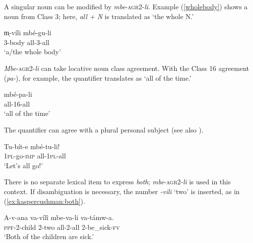 \documentclass[output=paper,modfonts,nonflat]{langsci/langscibook}
\begin{document}
A singular noun can be modified by \textit{mbe}-\textsc{agr2}-\textit{li}. Example (\ref{wholebody}) shows a noun from Class 3; here, \textit{all + N} is translated as `the whole N.'

\begin{exe} 

\ex 
\gll m̩-víli mbé-gu-li  \label{wholebody} \\   
3-body all-3-all \\
\glt `a/the whole body' \\  

\end{exe}


\textit{Mbe}-\textsc{agr2}-\textit{li} can take locative noun class agreement. With the Class 16 agreement (\textit{pa-}), for example, the quantifier translates as `all of the time.'

\begin{exe}
\ex 
\gll mbé-pa-li \\
all-16-all \\
\glt `all of the time' \\
\end{exe}


The quantifier can agree with a plural personal subject (see also \citealt{jerro13}).

\begin{exe}   

\ex 
\gll Tu-bít-e mbé-tu-li! \label{subjectagreement} \\
\textsc{1pl}-go-\textsc{imp} all-\textsc{1pl}-all \\  
\glt `Let's all go!'

\end{exe}


There is no separate lexical item to express \textit{both}; \textit{mbe}-\textsc{agr2}-\textit{li} is used in this context.  If disambiguation is necessary, the number \textit{-vili} `two' is inserted, as in (\ref{ex:kaspercushman:both}).

\begin{exe} 

\ex 
\gll A-v-ana va-víl\^i mbe-va-li va-támw-a. \\ 
\textsc{ppf}-2-child 2-two all-2-all 2-be\_sick-\textsc{fv} \\ \label{ex:kaspercushman:both}
\glt `Both of the children are sick.' \\

\end{exe}
\end{document}
